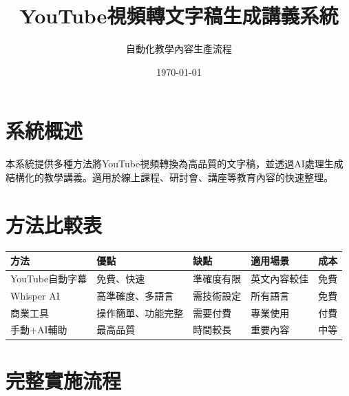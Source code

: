\documentclass[12pt,a4paper]{article}
\title{\textbf{YouTube視頻轉文字稿生成講義系統}}
\author{自動化教學內容生產流程}
\date{\today}
\begin{document}
\maketitle
\tableofcontents
\newpage

\section{系統概述}

本系統提供多種方法將YouTube視頻轉換為高品質的文字稿，並透過AI處理生成結構化的教學講義。適用於線上課程、研討會、講座等教育內容的快速整理。

\section{方法比較表}

\begin{longtable}{|p{3cm}|p{3cm}|p{3cm}|p{3cm}|p{2cm}|}
\hline
\textbf{方法} & \textbf{優點} & \textbf{缺點} & \textbf{適用場景} & \textbf{成本} \\
\hline
YouTube自動字幕 & 免費、快速 & 準確度有限 & 英文內容較佳 & 免費 \\
\hline
Whisper AI & 高準確度、多語言 & 需技術設定 & 所有語言 & 免費 \\
\hline
商業工具 & 操作簡單、功能完整 & 需要付費 & 專業使用 & 付費 \\
\hline
手動+AI輔助 & 最高品質 & 時間較長 & 重要內容 & 中等 \\
\hline
\end{longtable}

\section{完整實施流程}
\end{document}
